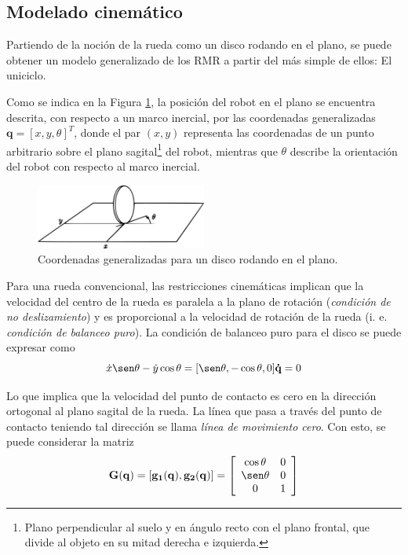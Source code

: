 \subsection{Modelado cinemático}
\label{ssec:mc}
Partiendo de la noción de la rueda como un disco rodando en el plano, se puede obtener un modelo generalizado de los RMR a partir del más simple de ellos: El uniciclo.
\par Como se indica en la Figura \ref{fig:Uni}, la posición del robot en el plano se encuentra descrita, con respecto a un marco inercial, por las coordenadas generalizadas $\mathbf{q}=[x, y, \theta]^{T}$, donde el par $(x, y)$ representa las coordenadas de un punto arbitrario sobre el plano sagital\footnote{Plano perpendicular al suelo y en ángulo recto con el plano frontal, que divide al objeto en su mitad derecha e izquierda.} del robot, mientras que $\theta$ describe la orientación del robot con respecto al marco inercial.
\begin{figure}[htbp!]
	\centering
	\includegraphics[width=0.5\textwidth]{./Figuras/Uniciclo}
	\caption{Coordenadas generalizadas para un disco rodando en el plano.}
	\label{fig:Uni}
\end{figure}
\par Para una rueda convencional, las restricciones cinemáticas implican que la velocidad del centro de la rueda es paralela a la plano de rotación ({\it condición de no deslizamiento}) y es proporcional a la velocidad de rotación de la rueda (i. e. {\it condición de balanceo puro}). La condición de balanceo puro para el disco se puede expresar como
\begin{equation}
	\dot{x}\sen\theta-\dot{y}\cos\theta=[\sen\theta, -\cos\theta, 0]\mathbf{\dot{q}}=0
\end{equation}
\par Lo que implica que la velocidad del punto de contacto es cero en la dirección ortogonal al plano sagital de la rueda. La línea que pasa a través del punto de contacto teniendo tal dirección se llama {\it línea de movimiento cero}. Con esto, se puede considerar la matriz
\[\mathbf{G(q)}=[\mathbf{g_{1}(q)}, \mathbf{g_{2}(q)}]=\left[
\begin{array}{cc}
\cos\theta & 0\\
\sen\theta & 0\\
0 & 1\\
\end{array}\right]\]
